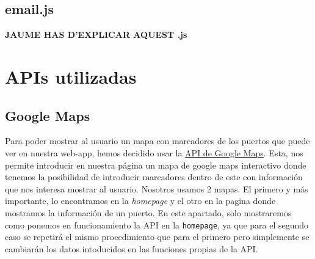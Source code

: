 \documentclass{article}
\begin{document}
\subsection{email.js}
\textbf{JAUME HAS D'EXPLICAR AQUEST .js}

\section{APIs utilizadas}
\subsection{Google Maps}
Para poder mostrar al usuario un mapa con marcadores de los puertos que puede ver en nuestra web-app, hemos decidido usar la \href{https://developers.google.com/maps?hl=es%2F%3Fq%3Dapis%20google}{API de Google Maps}. Esta, nos permite introducir en nuestra página un mapa de google maps interactivo donde tenemos la posibilidad de introducir marcadores dentro de este con información que nos interesa mostrar al usuario. Nosotros usamos 2 mapas. El primero y más importante, lo encontramos en la \textit{homepage} y el otro en la pagina donde mostramos la información de un puerto. En este apartado, solo mostraremos como ponemos en funcionamiento la API en la \texttt{homepage}, ya que para el segundo caso se repetirá el mismo procedimiento que para el primero pero simplemente se cambiarán los datos intoducidos en las funciones propias de la API.\\
\end{document}
